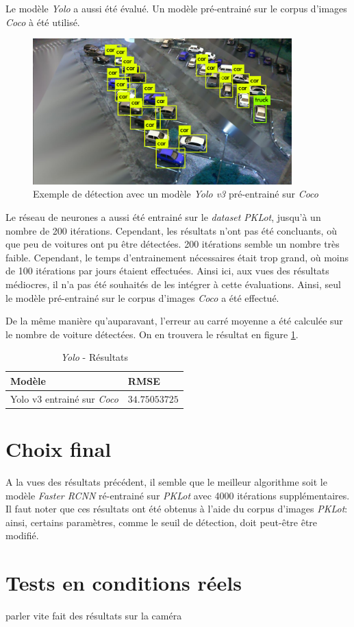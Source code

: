 Le modèle \textit{Yolo} a aussi été évalué. Un modèle pré-entrainé sur le corpus d'images \textit{Coco}\autocite{data:coco} à été utilisé.

\begin{figure}[ht]
    \includegraphics[width=10cm]{img/tests/yolo_bb.png}
    \centering
    \caption{Exemple de détection avec un modèle \textit{Yolo v3} pré-entrainé sur \textit{Coco}}
    \label{fig:yolo_bb}
\end{figure} 

Le réseau de neurones a aussi été entrainé sur le \textit{dataset} \textit{PKLot}, jusqu'à un nombre de 200 itérations. Cependant, les résultats n'ont pas été concluants, où que peu de voitures ont pu être détectées. 200 itérations semble un nombre très faible. Cependant, le temps d'entrainement nécessaires était trop grand, où moins de 100 itérations par jours étaient effectuées. Ainsi ici, aux vues des résultats médiocres, il n'a pas été souhaités de les intégrer à cette évaluations. Ainsi, seul le modèle pré-entrainé sur le corpus d'images \textit{Coco} a été effectué. 

De la même manière qu'auparavant, l'erreur au carré moyenne a été calculée sur le nombre de voiture détectées. On en trouvera le résultat en figure \ref{tab:yolo_results}.

\begin{table}[ht]
\centering
\begin{tabular}{@{}ll@{}}
\toprule
Modèle & RMSE \\ \midrule
Yolo v3 entrainé sur \textit{Coco}  & $34.75053725$ \\ \bottomrule
\end{tabular}
\caption{\textit{Yolo} - Résultats}
\label{tab:yolo_results}
\end{table}

\section{Choix final} \label{tests.final}

A la vues des résultats précédent, il semble que le meilleur algorithme soit le modèle \textit{Faster RCNN} ré-entrainé sur \textit{PKLot} avec 4000 itérations supplémentaires. Il faut noter que ces résultats ont été obtenus à l'aide du corpus d'images \textit{PKLot}: ainsi, certains paramètres, comme le seuil de détection, doit peut-être être modifié. 


\section{Tests en conditions réels}
parler vite fait des résultats sur la caméra